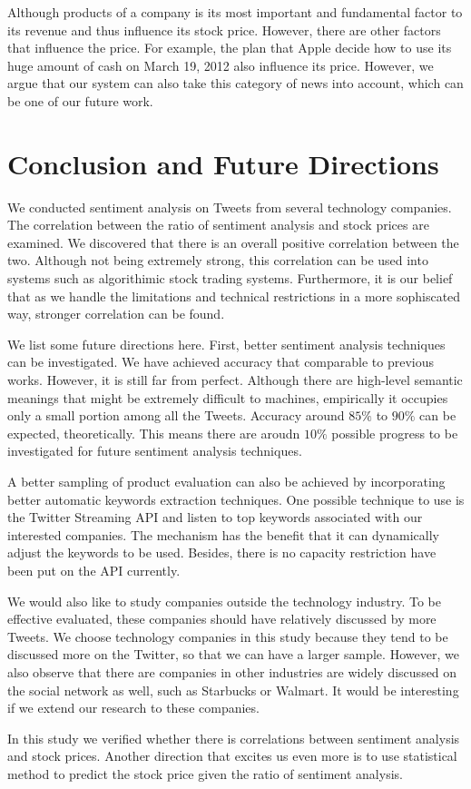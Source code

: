 \documentclass[12pt]{article}
\begin{document}
Although products of a company is its most important and fundamental factor to its revenue and thus influence its stock price. However, there are other factors that influence the price. For example, the plan that Apple decide how to use its huge amount of cash on March 19, 2012 also influence its price. However, we argue that our system can also take this category of news into account, which can be one of our future work.

\section{Conclusion and Future Directions}

We conducted sentiment analysis on Tweets from several technology companies. The correlation between the ratio of sentiment analysis and stock prices are examined. We discovered that there is an overall positive correlation between the two. Although not being extremely strong, this correlation can be used into systems such as algorithimic stock trading systems. Furthermore, it is our belief that as we handle the limitations and technical restrictions in a more sophiscated way, stronger correlation can be found.

We list some future directions here. First, better sentiment analysis techniques can be investigated. We have achieved accuracy that comparable to previous works. However, it is still far from perfect. Although there are high-level semantic meanings that might be extremely difficult to machines, empirically it occupies only a small portion among all the Tweets. Accuracy around $85\%$ to $90\%$ can be expected, theoretically. This means there are aroudn $10\%$ possible progress to be investigated for future sentiment analysis techniques.

A better sampling of product evaluation can also be achieved by incorporating better automatic keywords extraction techniques. One possible technique to use is the Twitter Streaming API \cite{TwtStrAPI} and listen to top keywords associated with our interested companies. The mechanism has the benefit that it can dynamically adjust the keywords to be used. Besides, there is no capacity restriction have been put on the API currently.

We would also like to study companies outside the technology industry. To be effective evaluated, these companies should have relatively discussed by more Tweets. We choose technology companies in this study because they tend to be discussed more on the Twitter, so that we can have a larger sample. However, we also observe that there are companies in other industries are widely discussed on the social network as well, such as Starbucks or Walmart. It would be interesting if we extend our research to these companies.

In this study we verified whether there is correlations between sentiment analysis and stock prices. Another direction that excites us even more is to use statistical method to predict the stock price given the ratio of sentiment analysis.



\end{document}
